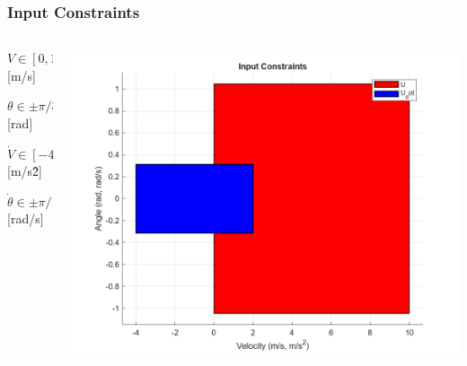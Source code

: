 \documentclass[aspectratio=169]{beamer}
\begin{document}
\begin{frame}
	\frametitle{Input Constraints}
	\begin{columns}
		\begin{column}{0.5\textwidth}
			$V \in [0,10]$ [m/s]

			$\theta \in \pm \pi/3$ [rad]

			$\dot{V} \in [-4,2]$ [m/s\^2]

			$\dot{\theta} \in \pm \pi/10$ [rad/s]
		\end{column}
		\begin{column}{0.5\textwidth}
			\includegraphics[width=\columnwidth]{figs/input_constraints.png}
		\end{column}
	\end{columns}
\end{frame}
\end{document}
